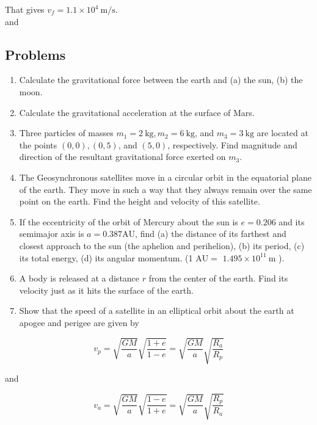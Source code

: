 \documentclass[10pt]{article}
\numberwithin{equation}{section}
\begin{document}
That gives $v_{f}=1.1 \times 10^{4} \mathrm{~m} / \mathrm{s}$.\\
and

\subsection*{Problems}
\begin{enumerate}
  \item Calculate the gravitational force between the earth and (a) the sun, (b) the moon.
  \item Calculate the gravitational acceleration at the surface of Mars.
  \item Three particles of masses $m_{1}=2 \mathrm{~kg}, m_{2}=6 \mathrm{~kg}$, and $m_{3}=3 \mathrm{~kg}$ are located at the points $(0,0),(0,5)$, and $(5,0)$, respectively. Find magnitude and direction of the resultant gravitational force exerted on $m_{3}$.
  \item The Geosynchronous satellites move in a circular orbit in the equatorial plane of the earth. They move in such a way that they always remain over the same point on the earth. Find the height and velocity of this satellite.
  \item If the eccentricity of the orbit of Mercury about the sun is $e=0.206$ and its semimajor axis is $a=0.387 \mathrm{AU}$, find (a) the distance of its farthest and closest approach to the sun (the aphelion and perihelion), (b) its period, (c) its total energy, (d) its angular momentum. (1 $\mathrm{AU}=$ $1.495 \times 10^{11} \mathrm{~m}$ ).
  \item A body is released at a distance $r$ from the center of the earth. Find its velocity just as it hits the surface of the earth.
  \item Show that the speed of a satellite in an elliptical orbit about the earth at apogee and perigee are given by
\end{enumerate}

$$
v_{p}=\sqrt{\frac{G M}{a}} \sqrt{\frac{1+e}{1-e}}=\sqrt{\frac{G M}{a}} \sqrt{\frac{R_{a}}{R_{p}}}
$$

and

$$
v_{a}=\sqrt{\frac{G M}{a}} \sqrt{\frac{1-e}{1+e}}=\sqrt{\frac{G M}{a}} \sqrt{\frac{R_{p}}{R_{a}}}
$$
\end{document}
